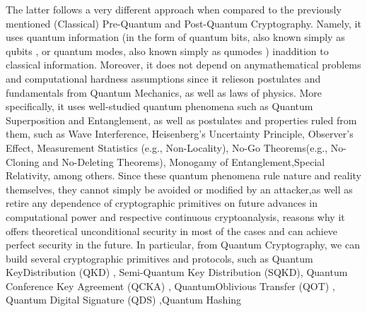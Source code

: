 \documentclass[runningheads]{llncs}
\numberwithin{equation}{section}
\begin{document}
    The latter follows a very different approach when compared to the previously mentioned (Classical) Pre-Quantum and Post-Quantum Cryptography. Namely, it uses quantum information (in the form of quantum bits, also known simply as qubits \cite{bennett-brassard:quantum-cryptography-public-key-distribution-and-coin-tossing:2014:06-2024,ekert:quantum-cryptography-based-bell-theorem:1991:06-2024}, or quantum modes, also known simply as qumodes \cite{hillery:quantum-cryptography-squeezed-states:2000:06-2024,grosshans-grangier:continuous-variable-quantum-cryptography-using-coherent-states:2002:06-2024,grosshans-et-al:quantum-key-distribution-using-gaussian-modulated-coherent-states:2003:06-2024}) in\break addition to classical information. Moreover, it does not depend on any\break mathematical problems and computational hardness assumptions since it relies\break on postulates and fundamentals from Quantum Mechanics, as well as laws of physics. More specifically, it uses well-studied quantum phenomena such as Quantum Superposition and Entanglement, as well as postulates and properties ruled from them, such as Wave Interference, Heisenberg's Uncertainty Principle, Observer's Effect, Measurement Statistics (e.g., Non-Locality), No-Go Theorems\break (e.g., No-Cloning and No-Deleting Theorems), Monogamy of Entanglement,\break Special Relativity, among others. Since these quantum phenomena rule nature and reality themselves, they cannot simply be avoided or modified by an attacker,\break as well as retire any dependence of cryptographic primitives on future advances in computational power and respective continuous cryptoanalysis, reasons why it offers theoretical unconditional security in most of the cases and can achieve perfect security in the future. In particular, from Quantum Cryptography, we can build several cryptographic primitives and protocols, such as Quantum Key\break Distribution (QKD) \cite{bennett-brassard:quantum-cryptography-public-key-distribution-and-coin-tossing:2014:06-2024,ekert:quantum-cryptography-based-bell-theorem:1991:06-2024,hillery:quantum-cryptography-squeezed-states:2000:06-2024,grosshans-grangier:continuous-variable-quantum-cryptography-using-coherent-states:2002:06-2024,grosshans-et-al:quantum-key-distribution-using-gaussian-modulated-coherent-states:2003:06-2024}, Semi-Quantum Key Distribution (SQKD)\break \cite{boyer-kenigsberg-mor:quantum-key-distribution-with-classical-bob:2007:06-2024,boyer-et-al:semiquantum-key-distribution:2009:06-2024}, Quantum Conference Key Agreement (QCKA) \cite{epping-et-al:multi-partite-entanglement-speed-up-quantum-key-distribution-networks:2017:06-2024,grasselli-kampermann-bruss:finite-key-effects-multipartite-quantum-key-distribution-protocols:2018:06-2024,murta-et-al:quantum-conference-key-agreement-review:2020:06-2024}, Quantum\break Oblivious Transfer (QOT) \cite{bennett-et-al:practical-quantum-oblivious-transfer:1992:06-2024,grilo-et-al:oblivious-transfer-miniqcrypt:2020:06-2024}, Quantum Digital Signature (QDS) \cite{gottesman-chuang:quantum-digital-signatures:2001:06-2024},\break Quantum Hashing 
\end{document}
